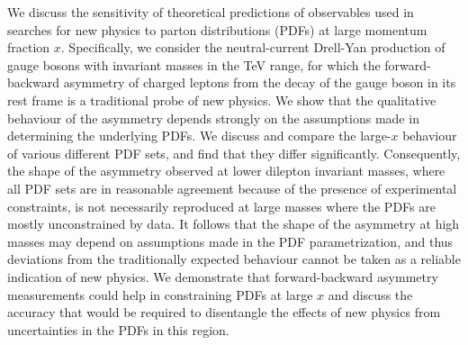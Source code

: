 We discuss the sensitivity of theoretical predictions of observables used in
searches for new physics to parton
distributions (PDFs) at large momentum fraction $x$.
%
Specifically, we consider the neutral-current Drell-Yan production of
gauge bosons with invariant masses in the TeV range, for which    
the forward-backward asymmetry of charged leptons
from the decay of the gauge boson in its rest frame is a traditional
probe of new physics. We show that the qualitative  behaviour of the asymmetry 
depends strongly on the assumptions made in determining the underlying PDFs.
%
 We discuss and compare the large-$x$
 behaviour of various different PDF sets, and find that they 
 differ significantly.
 Consequently, the shape of the asymmetry observed at lower
 dilepton invariant masses, where all PDF sets are in reasonable agreement 
because of  the presence of experimental constraints,
 is not necessarily reproduced at large masses where the
 PDFs are mostly unconstrained by data.
%
 It follows that the shape 
of the asymmetry at high masses may depend on 
assumptions made in the PDF parametrization, 
and thus deviations from the traditionally expected behaviour cannot be taken as a reliable 
indication of new physics.
%
We demonstrate that forward-backward asymmetry measurements
could help in constraining PDFs at large $x$ and discuss the accuracy that would be required to
disentangle the effects of new physics from uncertainties in the PDFs in this region.
